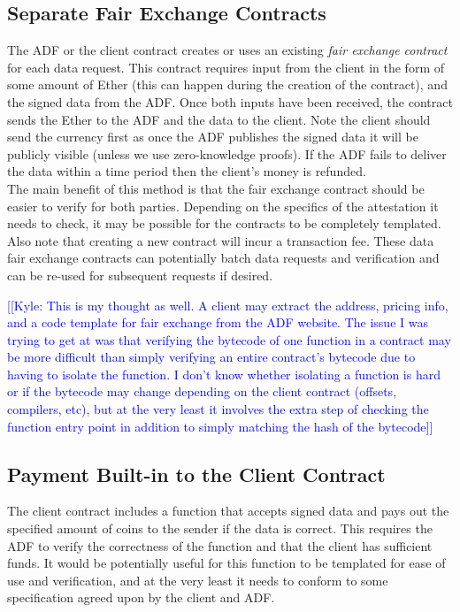 \documentclass[letterpaper,twocolumn,10pt]{article}
\newcommand{\kyle}[1]{\textcolor{blue}{[[\textsf{Kyle:  #1}]]}}
\begin{document}
\subsection{Separate Fair Exchange Contracts}
    The ADF or the client contract creates or uses an existing \emph{fair exchange contract} for each data request.  This contract requires input from the client in the form of some amount of Ether (this can happen during the creation of the contract), and the signed data from the ADF.  Once both inputs have been received, the contract sends the Ether to the ADF and the data to the client. Note the client should send the currency first as once the ADF publishes the signed data it will be publicly visible (unless we use zero-knowledge proofs). If the ADF fails to deliver the data within a time period then the client's money is refunded.\\
    \indent The main benefit of this method is that the fair exchange contract should be easier to verify for both parties.  Depending on the specifics of the attestation it needs to check, it may be possible for the contracts to be completely templated.  Also note that creating a new contract will incur a transaction fee.  These data fair exchange contracts can potentially batch data requests and verification and can be re-used for subsequent requests if desired. 
    
    \kyle{This is my thought as well.  A client may extract the address, pricing info, and a code template for fair exchange from the ADF website.  The issue I was trying to get at was that verifying the bytecode of one function in a contract may be more difficult than simply verifying an entire contract's bytecode due to having to isolate the function.  I don't know whether isolating a function is hard or if the bytecode may change depending on the client contract (offsets, compilers, etc), but at the very least it involves the extra step of checking the function entry point in addition to simply matching the hash of the bytecode}
    
\subsection{Payment Built-in to the Client Contract}
    The client contract includes a function that accepts signed data and pays out the specified amount of coins to the sender if the data is correct.  This requires the ADF to verify the correctness of the function and that the client has sufficient funds.  It would be potentially useful for this function to be templated for ease of use and verification, and at the very least it needs to conform to some specification agreed upon by the client and ADF. 
    
\end{document}
